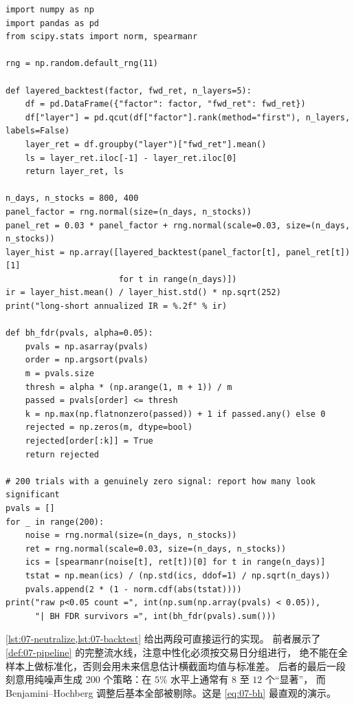 \begin{lstlisting}[style=pythonstyle,
                   caption={分层回测与多重检验（Benjamini--Hochberg FDR）调整},
                   label={lst:07-backtest}]
import numpy as np
import pandas as pd
from scipy.stats import norm, spearmanr

rng = np.random.default_rng(11)

def layered_backtest(factor, fwd_ret, n_layers=5):
    df = pd.DataFrame({"factor": factor, "fwd_ret": fwd_ret})
    df["layer"] = pd.qcut(df["factor"].rank(method="first"), n_layers, labels=False)
    layer_ret = df.groupby("layer")["fwd_ret"].mean()
    ls = layer_ret.iloc[-1] - layer_ret.iloc[0]
    return layer_ret, ls

n_days, n_stocks = 800, 400
panel_factor = rng.normal(size=(n_days, n_stocks))
panel_ret = 0.03 * panel_factor + rng.normal(scale=0.03, size=(n_days, n_stocks))
layer_hist = np.array([layered_backtest(panel_factor[t], panel_ret[t])[1]
                       for t in range(n_days)])
ir = layer_hist.mean() / layer_hist.std() * np.sqrt(252)
print("long-short annualized IR = %.2f" % ir)

def bh_fdr(pvals, alpha=0.05):
    pvals = np.asarray(pvals)
    order = np.argsort(pvals)
    m = pvals.size
    thresh = alpha * (np.arange(1, m + 1)) / m
    passed = pvals[order] <= thresh
    k = np.max(np.flatnonzero(passed)) + 1 if passed.any() else 0
    rejected = np.zeros(m, dtype=bool)
    rejected[order[:k]] = True
    return rejected

# 200 trials with a genuinely zero signal: report how many look significant
pvals = []
for _ in range(200):
    noise = rng.normal(size=(n_days, n_stocks))
    ret = rng.normal(scale=0.03, size=(n_days, n_stocks))
    ics = [spearmanr(noise[t], ret[t])[0] for t in range(n_days)]
    tstat = np.mean(ics) / (np.std(ics, ddof=1) / np.sqrt(n_days))
    pvals.append(2 * (1 - norm.cdf(abs(tstat))))
print("raw p<0.05 count =", int(np.sum(np.array(pvals) < 0.05)),
      "| BH FDR survivors =", int(bh_fdr(pvals).sum()))
\end{lstlisting}

\cref{lst:07-neutralize,lst:07-backtest} 给出两段可直接运行的实现。
前者展示了 \cref{def:07-pipeline} 的完整流水线，注意中性化必须按交易日分组进行，
绝不能在全样本上做标准化，否则会用未来信息估计横截面均值与标准差。
后者的最后一段刻意用纯噪声生成 $200$ 个策略：在 $5\%$ 水平上通常有 $8$ 至 $12$ 个“显著”，
而 Benjamini--Hochberg 调整后基本全部被剔除。这是 \cref{eq:07-bh} 最直观的演示。

